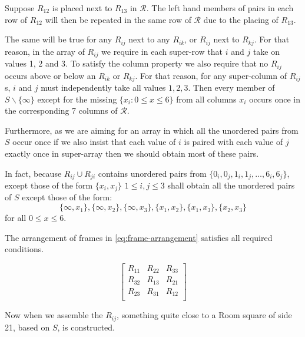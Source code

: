 \begin{example}
Suppose $R_{12}$ is placed next to $R_{13}$ in $\mathcal{R}$.
The left hand members of pairs in each row of $R_{12}$ will then be repeated in the same row of $\mathcal{R}$ due to the placing of $R_{13}$.

The same will be true for any $R_{ij}$ next to any $R_{ik}$, or $R_{ij}$ next to $R_{kj}$.
For that reason, in the array of $R_{ij}$ we require in each super-row that $i$ and $j$ take on values 1, 2 and 3.
To satisfy the column property we also require that no $R_{ij}$ occurs above or below an $R_{ik}$ or $R_{kj}$.
For that reason, for any super-column of $R_{ij}$s, $i$ and $j$ must independently take all values $1, 2, 3$.
Then every member of $S \backslash \{\infty\}$ except for the missing $\{x_i: 0 \leq x \leq 6\}$ from all columns $x_i$ occurs once in the corresponding 7 columns of $\mathcal{R}$.

Furthermore, as we are aiming for an array in which all the unordered pairs from $S$ occur once if we also insist that each value of $i$ is paired with each value of $j$ exactly once in super-array then we should obtain most of these pairs.

In fact, because $R_{ij} \cup R_{ji}$ contains unordered pairs from $\{0_{i},0_{j},1_{i},1_{j}, \ldots, 6_{i},6_{j}\}$, except those of the form $\{x_{i}, x_{j}\}$ $1 \leq i, j \leq 3$ shall obtain all the unordered pairs of $S$ except those of the form:
\begin{equation*}
\{\infty, x_1\}, \{\infty, x_2\}, \{\infty, x_3\}, \{x_1, x_2\}, \{x_1, x_3\}, \{x_2, x_3\}
\end{equation*}
for all $0 \leq x \leq 6$.

The arrangement of frames in \eqref{eq:frame-arrangement} satisfies all required conditions.

\begin{equation}
  \begin{bmatrix}
    R_{11} & R_{22} & R_{33} \\
    R_{32} & R_{13} & R_{21} \\
    R_{23} & R_{31} & R_{12} \\
  \end{bmatrix}
  \label{eq:frame-arrangement}
\end{equation}

Now when we assemble the $R_{ij}$, something quite close to a Room square of side 21, based on $S$, is constructed.
\end{example}

